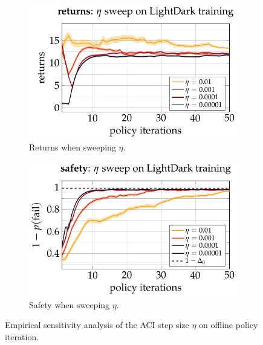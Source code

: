 \begin{figure}[b!]
    \centering

    \begin{subfigure}[b]{0.45\textwidth}
        \centering
        \includegraphics[width=\textwidth]{figures/constrainedzero/results/eta_sweep_ld_ret.pdf}
        \caption{Returns when sweeping $\eta$.}
        \label{fig:eta_returns}
    \end{subfigure}
    \hfill
    \begin{subfigure}[b]{0.45\textwidth}
        \centering
        \includegraphics[width=\textwidth]{figures/constrainedzero/results/eta_sweep_ld_acc.pdf}
        \caption{Safety when sweeping $\eta$.}
        \label{fig:eta_safety}
    \end{subfigure}

    \caption{Empirical sensitivity analysis of the ACI step size $\eta$ on offline policy iteration.}
    \label{fig:eta_sweep}
\end{figure}


